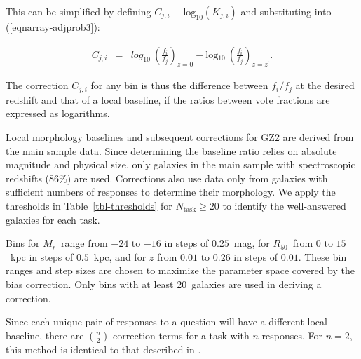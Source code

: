 \documentclass[useAMS,usenatbib]{mn2e}
\newcommand{\mr}{$M_r$}
\newcommand{\rfifty}{$R_{50}$}
\newcommand{\redshift}{$z$}
\begin{document}
\noindent This can be simplified by defining $C_{j,i}\equiv\text{log}_{10}(K_{j,i})$ and substituting into (\ref{eqnarray-adjprob3}):

\begin{eqnarray}
C_{j,i} &=& \text{$log_{10}$}~\left(\frac{f_i}{f_j}\right)_{z=0} - \text{log$_{10}$}~\left(\frac{f_i}{f_j}\right)_{z=z^\prime}.
\label{eqnarray-adjprob4}
\end{eqnarray}

\noindent The correction $C_{j,i}$ for any bin is thus the difference between $f_i/f_j$ at the desired redshift and that of a local baseline, if the ratios between vote fractions are expressed as logarithms.  

Local morphology baselines and subsequent corrections for GZ2 are derived from the main sample data. Since determining the baseline ratio relies on absolute magnitude and physical size, only galaxies in the main sample with spectroscopic redshifts (86\%) are used. Corrections also use data only from galaxies with sufficient numbers of responses to determine their morphology. We apply the thresholds in Table~\ref{tbl-thresholds} for $N_\mathrm{task}\geq20$ to identify the well-answered galaxies for each task.

Bins for \mr~range from $-24$ to $-16$ in steps of $0.25$~mag, for \rfifty~from $0$ to $15$~kpc in steps of $0.5$~kpc, and for $z$ from $0.01$ to $0.26$ in steps of $0.01$. These bin ranges and step sizes are chosen to maximize the parameter space covered by the bias correction. Only bins with at least 20~galaxies are used in deriving a correction. 

Since each unique pair of responses to a question will have a different local baseline, there are $\binom{n}{2}$ correction terms for a task with $n$ responses. For $n=2$, this method is identical to that described in \citet{bam09}. 
\end{document}
